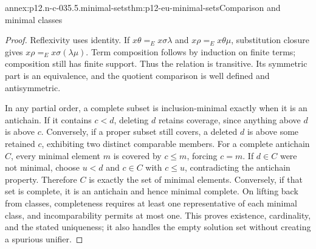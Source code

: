 \begin{annexitem}{annex:p12.n-c-035.5.minimal-sets}{thm:p12-eu-minimal-sets}{Comparison and minimal classes}
\begin{proof}
Reflexivity uses identity. If \(x\theta=_E x\sigma\lambda\) and
\(x\rho=_E x\theta\mu\), substitution closure gives
\(x\rho=_E x\sigma(\lambda\mu)\). Term composition follows by
induction on finite terms; composition still has finite support.
Thus the relation is transitive. Its symmetric part is an equivalence,
and the quotient comparison is well defined and antisymmetric.

In any partial order, a complete subset is inclusion-minimal exactly
when it is an antichain. If it contains \(c<d\), deleting \(d\)
retains coverage, since anything above \(d\) is above \(c\).
Conversely, if a proper subset still covers, a deleted \(d\) is above
some retained \(c\), exhibiting two distinct comparable members.
For a complete antichain \(C\), every minimal element \(m\) is
covered by \(c\leq m\), forcing \(c=m\). If \(d\in C\) were
not minimal, choose \(u<d\) and \(c\in C\) with \(c\leq u\),
contradicting the antichain property. Therefore \(C\) is exactly
the set of minimal elements. Conversely, if that set is complete,
it is an antichain and hence minimal complete. On lifting back from
classes, completeness requires at least one representative of each
minimal class, and incomparability permits at most one. This proves
existence, cardinality, and the stated uniqueness; it also handles
the empty solution set without creating a spurious unifier.
\end{proof}
\end{annexitem}

